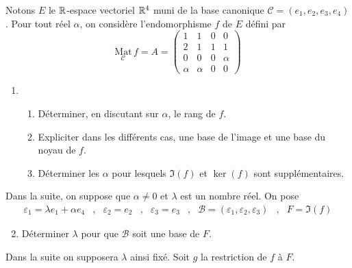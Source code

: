 Notons $E$ le $\mathbb{R}$-espace vectoriel $\mathbb{R}^4$ muni de la base canonique $\mathcal C = (e_1,e_2,e_3,e_4)$.\newline
 Pour tout réel $\alpha$, on considère l'endomorphisme $f$ de $E$ défini par 
\begin{displaymath}
 \underset{\mathcal{C}}{\mathrm{Mat}}\, f = A =
\begin{pmatrix}
 1 & 1 & 0 & 0  \\
2 & 1 & 1 & 1 \\
0 & 0 & 0 & \alpha \\
\alpha & \alpha & 0 & 0 
\end{pmatrix}
\end{displaymath}
\begin{enumerate}
 \item \begin{enumerate}
 \item Déterminer, en discutant sur $\alpha$, le rang de $f$.
\item Expliciter dans les différents cas, une base de l'image et une base du noyau de $f$.
\item Déterminer les $\alpha$ pour lesquels $\Im(f)$ et $\ker(f)$ sont supplémentaires.
\end{enumerate}
\end{enumerate}

Dans la suite, on suppose que $\alpha\neq 0$ et $\lambda$ est un nombre réel. On pose 
\begin{align*}
\varepsilon_1 = \lambda e_1 + \alpha e_4 &,& \varepsilon_2 = e_2 &,& \varepsilon_3 = e_3
&,& \mathcal B = (\varepsilon_1,\varepsilon_2,\varepsilon_3) &,& F=\Im(f)
\end{align*}

\begin{enumerate}
\setcounter{enumi}{1}
 \item Déterminer $\lambda$ pour que $\mathcal B$ soit une base de $F$.
\end{enumerate}

Dans la suite on supposera $\lambda$ ainsi fixé. Soit $g$ la restriction de $f$ à $F$.

